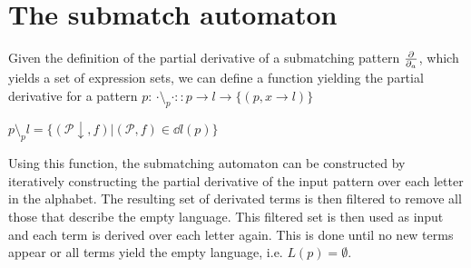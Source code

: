 \section{The submatch automaton}
\label{nfa}

Given the definition of the partial derivative of a submatching pattern $\frac{\partial}{\partial_{a}}$,
which yields a set of expression sets, we can define a function yielding the
partial derivative for a pattern $p$:
$\cdot \setminus_p \cdot :: p \to l \to \{(p, x \to l)\}$

$p \setminus_p l = \{ (\mathcal{P}\downarrow, f) | (\mathcal{P}, f) \in \dd{l}(p) \}$

Using this function, the submatching automaton can be constructed by iteratively
constructing the partial derivative of the input pattern over each letter in the
alphabet. The resulting set of derivated terms is then filtered to remove all
those that describe the empty language. This filtered set is then used as input
and each term is derived over each letter again. This is done until no new terms
appear or all terms yield the empty language, i.e. $L(p) = \emptyset$.

